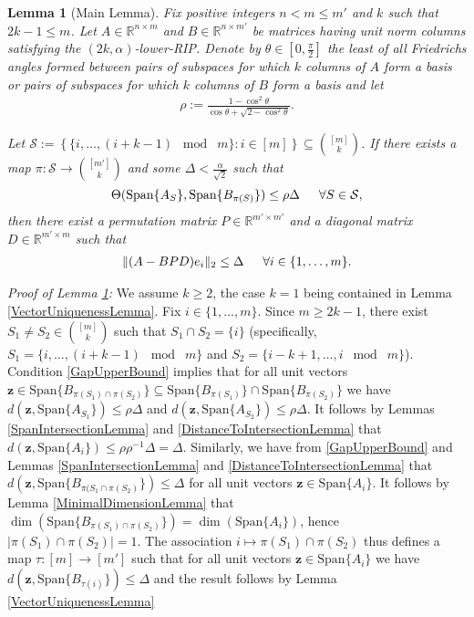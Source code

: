 \documentclass[journal,onecolumn]{IEEEtran}
\newtheorem{lemma}{Lemma}
\begin{document}
\begin{lemma}[Main Lemma]\label{MainLemma}
Fix positive integers $n < m \leq m'$ and $k$ such that $2k - 1 \leq m$. Let $A \in \mathbb{R}^{n \times m}$ and $B \in \mathbb{R}^{n \times m'}$ be matrices having unit norm columns satisfying the $(2k,\alpha)$-lower-RIP. Denote by $\theta \in [0, \frac{\pi}{2}]$ the least of all Friedrichs angles formed between pairs of subspaces for which $k$ columns of $A$ form a basis or pairs of subspaces for which $k$ columns of $B$ form a basis and let
\begin{align}
\rho := \frac{1 - \cos^2\theta} {\cos\theta + \sqrt{2 - \cos^2\theta}}.
\end{align}

Let $\mathcal{S} := \left\{ \{i, \ldots, (i + k-1)\;\bmod\; m \}: i \in [m] \right\} \subseteq {[m] \choose k}$. If there exists a map $\pi: \mathcal{S} \to {[m'] \choose k}$ and some $\Delta < \frac{\alpha}{\sqrt{2}}$ such that 
\begin{equation}\label{GapUpperBound}
\Theta(\text{Span}\{A_S\}, \text{Span}\{B_{\pi(S)}\}) \leq \rho \Delta \indent \forall S \in \mathcal{S},
\end{equation}
%
then there exist a permutation matrix $P \in \mathbb{R}^{m' \times m'}$ and a diagonal matrix $D \in \mathbb{R}^{m' \times m}$ such that
\begin{align}
\|(A - BPD)e_i\|_2 \leq \Delta \indent \forall i \in \{1, \ldots, m\}.
\end{align}
\end{lemma}

\emph{Proof of Lemma \ref{MainLemma}:} 
We assume $k \geq 2$, the case $k = 1$ being contained in Lemma \ref{VectorUniquenessLemma}. Fix $i \in \{1, \ldots, m\}$. Since $m \geq 2k - 1$, there exist $S_1 \neq S_2 \in {[m] \choose k}$ such that $S_1 \cap S_2 = \{i\}$ (specifically, $S_1 = \{i, \ldots, (i + k-1)\;\bmod\; m \}$ and  $S_2 = \{i-k+1, \ldots, i\;\bmod\; m \}$). Condition \eqref{GapUpperBound} implies that for all unit vectors $\mathbf{z} \in  \text{Span}\{B_{\pi(S_1) \cap \pi(S_2)}\} \subseteq \text{Span}\{B_{\pi(S_1)}\} \cap \text{Span}\{B_{\pi(S_2)}\}$ we have $d(\mathbf{z}, \text{Span}\{A_{S_1}\}) \leq \rho \Delta$ and $d(\mathbf{z}, \text{Span}\{A_{S_2}\}) \leq \rho \Delta$. It follows by Lemmas \ref{SpanIntersectionLemma} and \ref{DistanceToIntersectionLemma} that $d\left( \mathbf{z}, \text{Span}\{A_{i}\} \right) \leq \rho \rho^{-1} \Delta = \Delta$. Similarly, we have from \eqref{GapUpperBound} and Lemmas \ref{SpanIntersectionLemma} and \ref{DistanceToIntersectionLemma} that $d\left( \mathbf{z}, \text{Span}\{B_{\pi(S_1 \cap \pi(S_2)} \} \right) \leq \Delta$ for all unit vectors $\mathbf{z} \in \text{Span}\{A_{i}\}$. It follows by Lemma \ref{MinimalDimensionLemma} that $\dim(\text{Span}\{B_{\pi(S_1) \cap \pi(S_2)}\}) = \dim(\text{Span}\{A_i\})$, hence $|\pi(S_1) \cap \pi(S_2)| = 1$. The association $i \mapsto \pi(S_1) \cap \pi(S_2)$ thus defines a map $\tau: [m] \to [m']$ such that for all unit vectors $\mathbf{z} \in \text{Span}\{A_{i}\}$ we have $d\left( \mathbf{z}, \text{Span}\{B_{\tau(i)}\} \right) \leq \Delta$ and the result follows by Lemma \ref{VectorUniquenessLemma}
\end{document}
